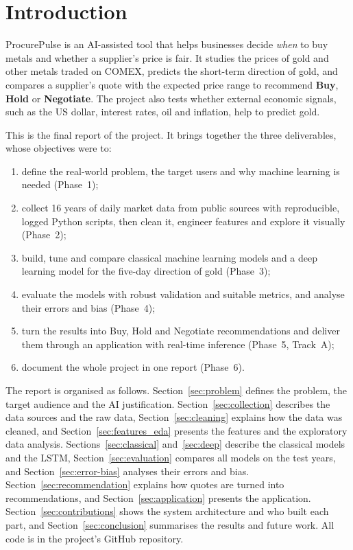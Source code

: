 \section{Introduction}
\label{sec:intro}

ProcurePulse is an AI-assisted tool that helps businesses decide \emph{when} to
buy metals and whether a supplier's price is fair. It studies the prices of
gold and other metals traded on COMEX, predicts the short-term direction of
gold, and compares a supplier's quote with the expected price range to
recommend \textbf{Buy}, \textbf{Hold} or \textbf{Negotiate}. The project also
tests whether external economic signals, such as the US dollar, interest
rates, oil and inflation, help to predict gold.

This is the final report of the project. It brings together the three
deliverables, whose objectives were to:
\begin{enumerate}
  \item define the real-world problem, the target users and why machine
        learning is needed (Phase~1);
  \item collect 16 years of daily market data from public sources with
        reproducible, logged Python scripts, then clean it, engineer features
        and explore it visually (Phase~2);
  \item build, tune and compare classical machine learning models and a deep
        learning model for the five-day direction of gold (Phase~3);
  \item evaluate the models with robust validation and suitable metrics, and
        analyse their errors and bias (Phase~4);
  \item turn the results into Buy, Hold and Negotiate recommendations and
        deliver them through an application with real-time inference
        (Phase~5, Track~A);
  \item document the whole project in one report (Phase~6).
\end{enumerate}

The report is organised as follows. Section~\ref{sec:problem} defines the
problem, the target audience and the AI justification. Section~\ref{sec:collection}
describes the data sources and the raw data, Section~\ref{sec:cleaning}
explains how the data was cleaned, and Section~\ref{sec:features_eda}
presents the features and the exploratory data analysis.
Sections~\ref{sec:classical} and~\ref{sec:deep} describe the classical models
and the LSTM, Section~\ref{sec:evaluation} compares all models on the test
years, and Section~\ref{sec:error-bias} analyses their errors and bias.
Section~\ref{sec:recommendation} explains how quotes are turned into
recommendations, and Section~\ref{sec:application} presents the application.
Section~\ref{sec:contributions} shows the system architecture and who built
each part, and Section~\ref{sec:conclusion} summarises the results and future
work. All code is in the project's GitHub repository.
